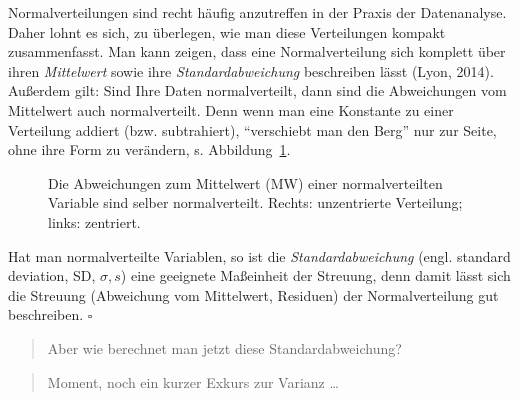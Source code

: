 \documentclass[
  letterpaper,
  twoside,
  open=any]{scrbook}
\theoremstyle{definition}
\theoremstyle{definition}
\theoremstyle{definition}
\theoremstyle{remark}
\begin{document}
Normalverteilungen sind recht häufig anzutreffen in der Praxis der
Datenanalyse. Daher lohnt es sich, zu überlegen, wie man diese
Verteilungen kompakt zusammenfasst. Man kann zeigen, dass eine
Normalverteilung sich komplett über ihren \emph{Mittelwert} sowie ihre
\emph{Standardabweichung} beschreiben lässt (Lyon, 2014). Außerdem gilt:
Sind Ihre Daten normalverteilt, dann sind die Abweichungen vom
Mittelwert auch normalverteilt. Denn wenn man eine Konstante zu einer
Verteilung addiert (bzw. subtrahiert), \enquote{verschiebt man den Berg}
nur zur Seite, ohne ihre Form zu verändern, s.
Abbildung~\ref{fig-norm-dev}.

\begin{figure}


\caption{\label{fig-norm-dev}Die Abweichungen zum Mittelwert (MW) einer
normalverteilten Variable sind selber normalverteilt. Rechts:
unzentrierte Verteilung; links: zentriert.}

\end{figure}%

Hat man normalverteilte Variablen, so ist die \emph{Standardabweichung}
(engl. standard deviation, SD, \(\sigma, s\)) eine geeignete Maßeinheit
der Streuung, denn damit lässt sich die Streuung (Abweichung vom
Mittelwert, Residuen) der Normalverteilung gut beschreiben. \(\square\)

\begin{quote}
{} Aber wie berechnet man jetzt diese Standardabweichung?
\end{quote}

\begin{quote}
{} Moment, noch ein kurzer Exkurs zur Varianz \ldots{}
\end{quote}
\end{document}
